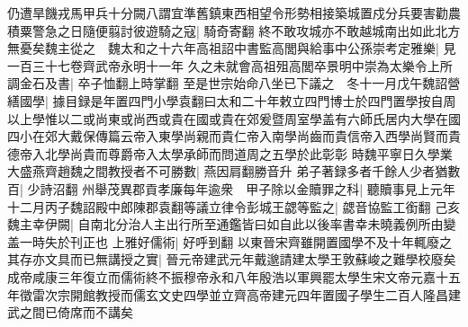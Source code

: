 仍遭旱饑戎馬甲兵十分闕八謂宜準舊鎮東西相望令形勢相接築城置戍分兵要害勸農積粟警急之日隨便翦討彼遊騎之寇|{
	騎奇寄翻}
終不敢攻城亦不敢越城南出如此北方無憂矣魏主從之　魏太和之十六年高祖詔中書監高閭與給事中公孫崇考定雅樂|{
	見一百三十七卷齊武帝永明十一年}
久之未就會高祖殂高閭卒景明中崇為太樂令上所調金石及書|{
	卒子恤翻上時掌翻}
至是世宗始命八坐已下議之　冬十一月戊午魏詔營繕國學|{
	據目録是年置四門小學袁翻曰太和二十年敕立四門博士於四門置學按自周以上學惟以二或尚東或尚西或貴在國或貴在郊爰暨周室學盖有六師氏居内大學在國四小在郊大戴保傳篇云帝入東學尚親而貴仁帝入南學尚齒而貴信帝入西學尚賢而貴德帝入北學尚貴而尊爵帝入太學承師而問道周之五學於此彰彰}
時魏平寧日久學業大盛燕齊趙魏之間教授者不可勝數|{
	燕因肩翻勝音升}
弟子著録多者千餘人少者猶數百|{
	少詩沼翻}
州舉茂異郡貢孝廉每年逾衆　甲子除以金贖罪之科|{
	聽贖事見上元年}
十二月丙子魏詔殿中郎陳郡袁翻等議立律令彭城王勰等監之|{
	勰音協監工銜翻}
己亥魏主幸伊闕|{
	自南北分治人主出行所至通鑑皆曰如自此以後率書幸未曉義例所由變盖一時失於刊正也}
上雅好儒術|{
	好呼到翻}
以東晉宋齊雖開置國學不及十年輒廢之其存亦文具而已無講授之實|{
	晉元帝建武元年戴邈請建太學王敦蘇峻之難學校廢矣成帝咸康三年復立而儒術終不振穆帝永和八年殷浩以軍興罷太學生宋文帝元嘉十五年徵雷次宗開館教授而儒玄文史四學並立齊高帝建元四年置國子學生二百人隆昌建武之間已倚席而不講矣}


